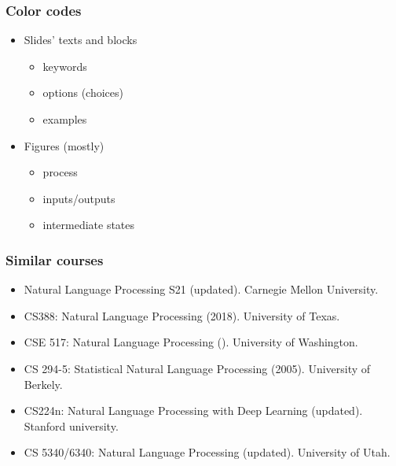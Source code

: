 \documentclass{beamer}
\begin{document}
\begin{frame}
	\frametitle{Color codes}
	
	
	\begin{itemize}
		\item Slides' texts and blocks
		\begin{itemize}
			\item {\Huge\raisebox{-0.125em}{${\color{red}\blacksquare}$}} keywords
			\item {\Huge\raisebox{-0.125em}{${\color{violet}\blacksquare}$}} options (choices)
			\item {\Huge\raisebox{-0.125em}{${\color{olivegreen}\blacksquare}$}} examples
		\end{itemize}
	
		\vfill
		\item Figures (mostly)
		\begin{itemize}
			\item {\Huge\raisebox{-0.125em}{${\color{red}\blacksquare}$}} process
			\item {\Huge\raisebox{-0.125em}{${\color{blue}\blacksquare}$}} inputs/outputs
			\item {\Huge\raisebox{-0.125em}{${\color{green}\blacksquare}$}} intermediate states
		\end{itemize}
	\end{itemize}
	
\end{frame}

\begin{frame}
	\frametitle{Similar courses}
	
	\begin{itemize}
			
			\item Natural Language Processing S21 (updated).
			Carnegie Mellon University. 
			
			\item CS388: Natural Language Processing (2018). 
			University of Texas. 
			
			\item CSE 517: Natural Language Processing ().
			University of Washington.
			
			\item CS 294-5: Statistical Natural Language Processing (2005). 
			University of Berkely. 
			
			\item CS224n: Natural Language Processing with Deep Learning (updated).
			Stanford university.
			
			\item CS 5340/6340: Natural Language Processing (updated). 
			University of Utah.
		
	\end{itemize}
	
\end{frame}
\end{document}
